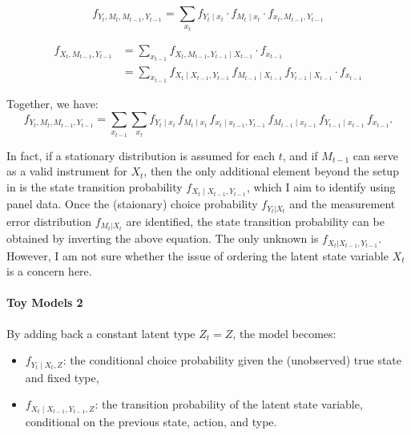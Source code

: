 \documentclass[12pt]{article}
\begin{document}
\begin{equation*}
    f_{Y_t, M_t, M_{t-1}, Y_{t-1}} = \sum_{x_t} f_{Y_t \mid x_t} \cdot f_{M_t \mid x_t} \cdot f_{x_t, M_{t-1}, Y_{t-1}}
\end{equation*}


\begin{equation*}
    \begin{split}
        f_{X_t, M_{t-1}, Y_{t-1}} & = \sum_{x_{t-1}} f_{X_t, M_{t-1},Y_{t-1}\mid X_{t-1}}\cdot f_{x_{t-1}} \\
        & = \sum_{x_{t-1}}f_{X_t\mid X_{t-1},Y_{t-1}}\,
        f_{M_{t-1}\mid X_{t-1}}\,
        f_{Y_{t-1}\mid X_{t-1}} \cdot f_{x_{t-1}}
    \end{split}
\end{equation*}

Together, we have:
\begin{equation*}
    f_{Y_t,M_t,M_{t-1},Y_{t-1}}
    =\sum_{x_{t-1}}\sum_{x_t}
    f_{Y_t\mid x_t}\,
    f_{M_t\mid x_t}\,
    f_{x_t\mid x_{t-1},Y_{t-1}}\,
    f_{M_{t-1}\mid x_{t-1}}\,
    f_{Y_{t-1}\mid x_{t-1}}\,
    f_{x_{t-1}} .
\end{equation*}

In fact, if a stationary distribution is assumed for each $t$, and if $M_{t-1}$ can serve as a valid instrument for $X_t$, then the only additional element beyond the setup in \citet{hu2008identification} is the state transition probability $f_{X_t \mid X_{t-1}, Y_{t-1}}$, which I aim to identify using panel data. Once the (staionary) choice probability $f_{Y_t|X_t}$ and the measurement error distribution $f_{M_t|X_t}$ are identified, the state transition probability can be obtained by inverting the above equation.  The only unknown is $f_{X_t|X_{t-1},Y_{t-1}}$. However, I am not sure whether the issue of ordering the latent state variable $X_t$ is a concern here.

\paragraph{Toy Models 2}

By adding back a constant latent type $Z_t = Z$, the model becomes:
\begin{itemize}
    \item $f_{Y_t \mid X_t, Z}$: the conditional choice probability given the (unobserved) true state and fixed type,
    \item $f_{X_t \mid X_{t-1}, Y_{t-1}, Z}$: the transition probability of the latent state variable, conditional on the previous state, action, and type.
\end{itemize}
\end{document}
